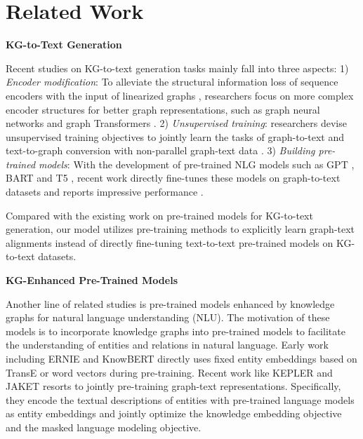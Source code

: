\documentclass[11pt,a4paper]{article}
\begin{document}
\section{Related Work}

\noindent \textbf{KG-to-Text Generation}

\noindent 
Recent studies on KG-to-text generation tasks mainly fall into three aspects: 1) {\it Encoder modification}: To alleviate the structural information loss of sequence encoders with the input of linearized graphs
\cite{gradent2017webnlg,bayu2018gtrlstm,mory2019step}, researchers focus on 
more complex encoder structures for better graph representations, such as graph neural networks \cite{marche2018gcn,ribeiro2020globallocal} and graph Transformers \cite{rik2019agenda,schmitt2020graformer}. 2) {\it Unsupervised training}: 
researchers 
devise unsupervised training objectives to jointly learn the tasks of graph-to-text and text-to-graph conversion with non-parallel graph-text data
\cite{schmitt2020unsupervised,guo2020cyclegt,jin2020genwiki}. 3) {\it Building pre-trained models}: With the development of pre-trained NLG models such as GPT \cite{radford2018gpt,radford2019gpt2}, BART \cite{lewis2020bart} and T5 \cite{raffel2020t5}, recent work directly fine-tunes these models on graph-to-text datasets and reports impressive performance \cite{ribeiro2020investigate,kale2020text,chen2020kgpt,mager2020gpttoo}.

Compared with the existing work on pre-trained models for KG-to-text generation, our model utilizes 
pre-training methods to explicitly learn graph-text alignments instead of directly fine-tuning text-to-text pre-trained models on KG-to-text datasets.



\noindent \textbf{KG-Enhanced Pre-Trained Models}

\noindent Another line of related studies is pre-trained models enhanced by knowledge graphs for natural language understanding (NLU). The motivation of these models is to incorporate knowledge graphs into pre-trained models to facilitate the understanding of entities and relations in natural language.
Early work including ERNIE \cite{zhang2019ernie} and KnowBERT \cite{peters2019knowbert} directly uses fixed entity embeddings based on TransE \cite{bordes2013transe} or word vectors \cite{mikolov2013wordvec} during pre-training. Recent work like KEPLER \cite{wang2019kepler} and JAKET \cite{yu2020jaket} resorts to jointly pre-training graph-text representations. Specifically, they encode the textual descriptions of entities with pre-trained language models as entity embeddings and jointly optimize the knowledge embedding objective and the masked language modeling objective.
\end{document}
